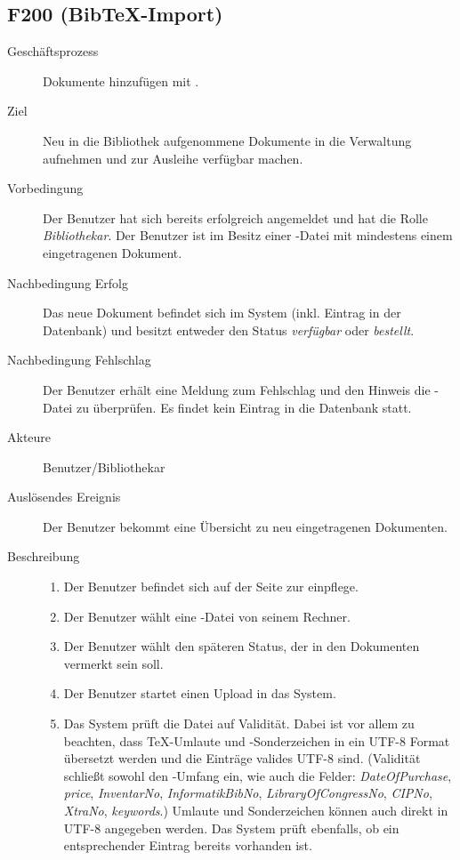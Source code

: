 \subsection{F200 (Bib\TeX-Import)}
\begin{description}
  \item[Geschäftsprozess]Dokumente hinzufügen mit \BibTeX.
  \item[Ziel]Neu in die Bibliothek aufgenommene Dokumente in die Verwaltung aufnehmen und zur Ausleihe verfügbar machen.
  \item[Vorbedingung]Der Benutzer hat sich bereits erfolgreich angemeldet und hat die Rolle \emph{Bibliothekar}. Der Benutzer ist im Besitz einer \BibTeX -Datei mit mindestens einem eingetragenen Dokument.
  \item[Nachbedingung Erfolg]Das neue Dokument befindet sich im System (inkl. Eintrag in der Datenbank) und besitzt entweder den Status \emph{verfügbar} oder \emph{bestellt}.
  \item[Nachbedingung Fehlschlag]Der Benutzer erhält eine Meldung zum Fehlschlag und den Hinweis die \BibTeX -Datei zu überprüfen. Es findet kein Eintrag in die Datenbank statt.
  \item[Akteure]Benutzer/Bibliothekar
  \item[Auslösendes Ereignis]Der Benutzer bekommt eine Übersicht zu neu eingetragenen Dokumenten.
  \item[Beschreibung]\hfill
    \begin{enumerate}
      \item Der Benutzer befindet sich auf der Seite zur \BibTeX einpflege.
      \item Der Benutzer wählt eine \BibTeX -Datei von seinem Rechner.
      \item Der Benutzer wählt den späteren Status, der in den Dokumenten vermerkt sein soll.
      \item Der Benutzer startet einen Upload in das System.
      \item Das System prüft die Datei auf Validität. Dabei ist vor allem zu beachten, dass \TeX-Umlaute und -Sonderzeichen in ein UTF-8 Format übersetzt werden und die Einträge valides UTF-8 sind.
	(Validität schließt sowohl den \BibTeX -Umfang ein, wie auch die Felder: \emph{DateOfPurchase}, \emph{price}, \emph{InventarNo}, \emph{InformatikBibNo}, \emph{LibraryOfCongressNo}, \emph{CIPNo}, \emph{XtraNo}, \emph{keywords}.) Umlaute und Sonderzeichen können auch direkt in UTF-8 angegeben werden.
	Das System prüft ebenfalls, ob ein entsprechender Eintrag bereits vorhanden ist.

\end{enumerate}
\end{description}
